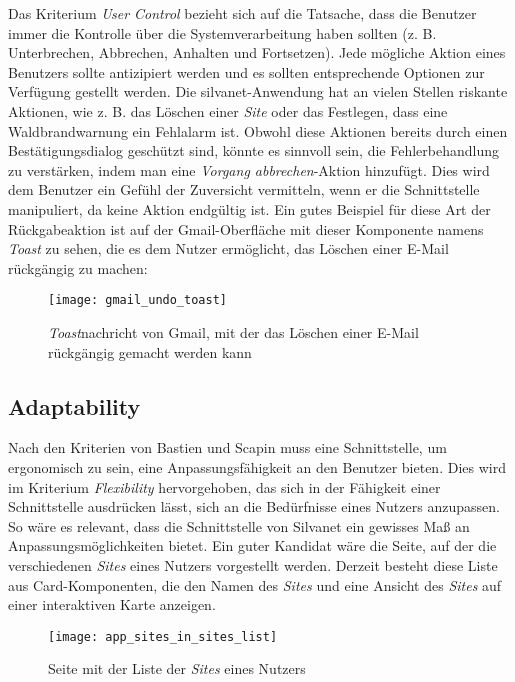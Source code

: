 Das Kriterium \textit{User Control} bezieht sich auf die Tatsache, dass die Benutzer immer die Kontrolle über die Systemverarbeitung haben sollten (z. B. Unterbrechen, Abbrechen, Anhalten und Fortsetzen).
Jede mögliche Aktion eines Benutzers sollte antizipiert werden und es sollten entsprechende Optionen zur Verfügung gestellt werden.
Die silvanet-Anwendung hat an vielen Stellen riskante Aktionen, wie z. B. das Löschen einer \textit{Site} oder das Festlegen, dass eine Waldbrandwarnung ein Fehlalarm ist.
Obwohl diese Aktionen bereits durch einen Bestätigungsdialog geschützt sind, könnte es sinnvoll sein, die Fehlerbehandlung zu verstärken, indem man eine \textit{Vorgang abbrechen}-Aktion hinzufügt.
Dies wird dem Benutzer ein Gefühl der Zuversicht vermitteln, wenn er die Schnittstelle manipuliert, da keine Aktion endgültig ist.
Ein gutes Beispiel für diese Art der Rückgabeaktion ist auf der Gmail-Oberfläche mit dieser Komponente namens \textit{Toast} zu sehen, die es dem Nutzer ermöglicht, das Löschen einer E-Mail rückgängig zu machen:

\begin{figure}[H]
  \centering
  \texttt{[image: gmail\_undo\_toast]}
  \caption{\textit{Toast}nachricht von Gmail, mit der das Löschen einer E-Mail rückgängig gemacht werden kann}
  \label{fig:gmail_undo_toast}
\end{figure}


\subsection{Adaptability}

Nach den Kriterien von Bastien und Scapin muss eine Schnittstelle, um ergonomisch zu sein, eine Anpassungsfähigkeit an den Benutzer bieten.
Dies wird im Kriterium \textit{Flexibility} hervorgehoben, das sich in der Fähigkeit einer Schnittstelle ausdrücken lässt, sich an die Bedürfnisse eines Nutzers anzupassen.
So wäre es relevant, dass die Schnittstelle von Silvanet ein gewisses Maß an Anpassungsmöglichkeiten bietet.
Ein guter Kandidat wäre die Seite, auf der die verschiedenen \textit{Sites} eines Nutzers vorgestellt werden.
Derzeit besteht diese Liste aus Card-Komponenten, die den Namen des \textit{Sites} und eine Ansicht des \textit{Sites} auf einer interaktiven Karte anzeigen.

\begin{figure}[H]
  \centering
  \texttt{[image: app\_sites\_in\_sites\_list]}
  \caption{Seite mit der Liste der \textit{Sites} eines Nutzers}
  \label{fig:app_sites_in_sites_list}
\end{figure}

